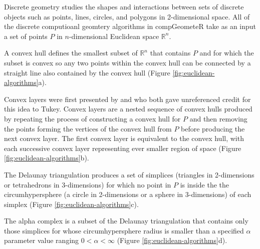 \documentclass[12pt, a4paper]{article}
\begin{document}
Discrete geometry studies the shapes and interactions between sets of discrete objects such as points, lines, circles, and polygons in 2-dimensional space.  All of the discrete computioanl geomtery algorithms in compGeometeR take as an input a set of points $P$ in $n$-dimensional Euclidean space $\mathbb{R}^n$.

A convex hull defines the smallest subset of $\mathbb{R}^n$ that contains $P$ and for which the subset is convex so any two points within the convex hull can be connected by a straight line also contained by the convex hull (Figure \ref{fig:euclidean-algorithms}a).

Convex layers were first presented by \cite{huber-1972} and \cite{barnett-1976} who both gave unreferenced credit for this idea to Tukey.  Convex layers are a nested sequence of convex hulls produced by repeating the process of constructing a convex hull for $P$ and then removing the points forming the vertices of the convex hull from $P$ before producing the next convex layer.  The first convex layer is equivalent to the convex hull, with each successive convex layer representing ever smaller region of space (Figure \ref{fig:euclidean-algorithms}b).

The Delaunay triangulation \citep{delaunay-1934} produces a set of simplices (triangles in 2-dimensions or tetrahedrons in 3-dimensions) for which no point in $P$ is inside the the circumhypersphere (a circle in 2-dimensions or a sphere in 3-dimensions) of each simplex (Figure \ref{fig:euclidean-algorithms}c).

The alpha complex \citep{edelsbrunner-1994} is a subset of the Delaunay triangulation that contains only those simplices for whose circumhypersphere radius is smaller than a specified $\alpha$ parameter value ranging $0 < \alpha < \infty$ (Figure \ref{fig:euclidean-algorithms}d).
\end{document}

